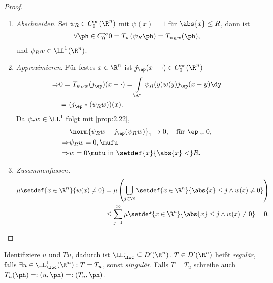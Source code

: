 \begin{proof}
\begin{enumerate}[label=\arabic{*})]
  \item \textit{Abschneiden}. Sei $\psi_R\in C_0^\infty(\R^n)$ mit $\psi(x) =
  1$ für $\abs{x}\le R$, dann ist
  \begin{align*}
  \forall \ph\in C_0^\infty 0 = T_w(\psi_R \ph) = T_{\psi_R w}(\ph),
  \end{align*}
und $\psi_R w\in \LL^1(\R^n)$.
\item \textit{Approximieren}. Für festes $x\in\R^n$ ist $j_\ep(x-\cdot)\in
C_0^\infty(\R^n)$
\begin{align*}
\Rightarrow &0 = T_{\psi_R w}(j_\ep)(x-\cdot) = \int\limits_{\R^n}
\psi_R(y)w(y)j_\ep(x-y)\dy \\ &= (j_\ep*(\psi_Rw))(x).
\end{align*}
Da $\psi_r w\in \LL^1$ folgt mit \ref{prop:2.22},
\begin{align*}
&\norm{\psi_Rw - j_\ep(\psi_Rw)}_1 \to 0,\quad \text{für }\ep\downarrow 0,\\
\Rightarrow &\psi_R w = 0,\mufu\\
\Rightarrow &w = 0 \mufu\text{ in }\setdef{x}{\abs{x}<}R.
\end{align*}
\item \textit{Zusammenfassen}.
\begin{align*}
\mu\setdef{x\in\R^n}{w(x)\neq 0} &= \mu\left(\bigcup\limits_{j\in\N}
\setdef{x\in\R^n}{\abs{x}\le j\land w(x)\neq 0}\right)
\\ &\le \sum\limits_{j=1}^\infty \mu\setdef{x\in\R^n}{\abs{x}\le j\land w(x)\neq
0} = 0.\qedhere
\end{align*}
\end{enumerate}
\end{proof}

\begin{defn}
\label{defn:3.8}
Identifiziere $u$ und $Tu$, dadurch ist $\LL_\loc^1\subseteq D'(\R^n)$.
$T\in D'(\R^n)$ heißt \emph{regulär}, falls $\exists u\in \LL_\loc^1(\R^n) : T
= T_u$, sonst \emph{singulär}. Falls $T=T_u$ schreibe auch $T_u(\ph) =: (u,\ph)
=: (T_u,\ph)$.
\fishhere
\end{defn}

